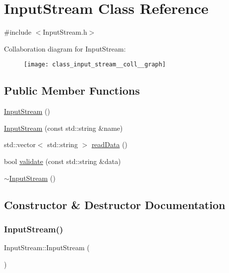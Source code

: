 \hypertarget{class_input_stream}{}\section{Input\+Stream Class Reference}
\label{class_input_stream}


{\ttfamily \#include $<$Input\+Stream.\+h$>$}



Collaboration diagram for Input\+Stream\+:
\nopagebreak
\begin{figure}[H]
\begin{center}
\leavevmode
\texttt{[image: class\_input\_stream\_\_coll\_\_graph]}
\end{center}
\end{figure}
\subsection*{Public Member Functions}
\begin{DoxyCompactItemize}
\item 
\mbox{\hyperlink{class_input_stream_aa76c86b53f016984cf52bed6e039e9c0}{Input\+Stream}} ()
\item 
\mbox{\hyperlink{class_input_stream_a5499ab72f052894993ba622f93641123}{Input\+Stream}} (const std\+::string \&name)
\item 
std\+::vector$<$ std\+::string $>$ \mbox{\hyperlink{class_input_stream_ad86e58ec31057d6e65ae289aabaab511}{read\+Data}} ()
\item 
bool \mbox{\hyperlink{class_input_stream_aca40de74030ea947a423880bec28ba30}{validate}} (const std\+::string \&data)
\item 
\mbox{\hyperlink{class_input_stream_ae71831adce618d60783c287a2ac7075a}{$\sim$\+Input\+Stream}} ()
\end{DoxyCompactItemize}


\subsection{Constructor \& Destructor Documentation}
\mbox{\label{class_input_stream_aa76c86b53f016984cf52bed6e039e9c0}} 
\subsubsection{\texorpdfstring{InputStream()}{InputStream()}\hspace{0.1cm}{\footnotesize\ttfamily [1/2]}}
{\footnotesize\ttfamily Input\+Stream\+::\+Input\+Stream (\begin{DoxyParamCaption}{ }\end{DoxyParamCaption})}

